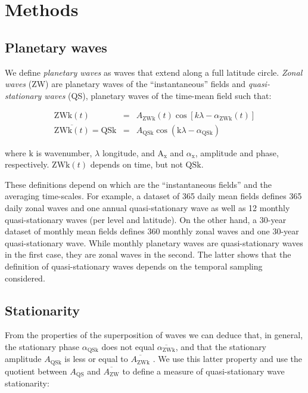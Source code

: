 \documentclass[draft,linenumbers]{agujournal2018}
\begin{document}
\section{Methods}

\subsection{Planetary waves}

We define \emph{planetary waves} as waves that extend along a full
latitude circle. \emph{Zonal waves} (ZW) are planetary waves of the
``instantaneous'' fields and \emph{quasi-stationary waves} (QS),
planetary waves of the time-mean field such that:

\begin{linenomath*}
\begin{eqnarray}\label{eq:ZW}
\mathrm{ZWk}(t) & = & A_\mathrm{ZWk}(t)\cos \left [ k\lambda - \alpha_\mathrm{ZWk}(t) \right ] \\ 
\overline{\mathrm{ZWk}(t)} = \mathrm{QSk} & = & A_\mathrm{QSk}\cos \left (  \mathrm{k}\lambda - \alpha_\mathrm{QSk} \right ) \label{eq:QS}
\end{eqnarray}
\end{linenomath*}

where \(\mathrm{k}\) is wavenumber, \(\lambda\) longitude, and
\(\mathrm{A_{x}}\) and \(\alpha_\mathrm{x}\), amplitude and phase,
respectively. \(\mathrm{ZWk}(t)\) depends on time, but not
\(\mathrm{QSk}\).

These definitions depend on which are the ``instantaneous fields'' and
the averaging time-scales. For example, a dataset of 365 daily mean
fields defines 365 daily zonal waves and one annual quasi-stationary
wave as well as 12 monthly quasi-stationary waves (per level and
latitude). On the other hand, a 30-year dataset of monthly mean fields
defines 360 monthly zonal waves and one 30-year quasi-stationary wave.
While monthly planetary waves are quasi-stationary waves in the first
case, they are zonal waves in the second. The latter shows that the
definition of quasi-stationary waves depends on the temporal sampling
considered.

\subsection{Stationarity}

From the properties of the superposition of waves we can deduce that, in
general, the stationary phase \(\alpha_\mathrm{QSk}\) does not equal
\(\overline{\alpha_\mathrm{ZWk}}\), and that the stationary amplitude
\(A_\mathrm{QSk}\) is less or equal to \(\overline{A_\mathrm{ZWk}}\)
\citep{pain2005}. We use this latter property and use the quotient
between \(A_\mathrm{QS}\) and \(\overline{A_\mathrm{ZW}}\) to define a
measure of quasi-stationary wave stationarity:
\end{document}
